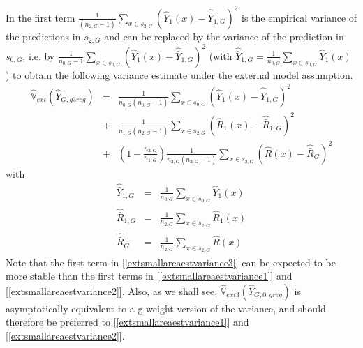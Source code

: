 \documentclass[a4paper,12pt,leqno, titlepage]{article}
\newcommand{\VAR}{\mathbb{V}}
\begin{document}
In the first term $\frac{1}{(n_{2,G}-1)}\sum_{x\in{s_{2,G}}}(\hat{Y}_1(x)-\hat{\bar{Y}}_{1,G})^2 $ is the empirical variance of the predictions in $s_{2,G}$ and can be replaced by the variance of the prediction in $s_{0,G}$, i.e. by $\frac{1}{n_{0,G}-1}\sum_{x\in{s_{0,G}}}(\hat{Y}_1(x)-\hat{\bar{Y}}_{1,G})^2$ (with
$\hat{\bar{Y}}_{1,G}=\frac{1}{n_{0,G}}\sum_{x\in{s_{0,G}}} \hat{Y}_1(x)$ ) to obtain the following variance estimate under the external model assumption.
 \begin{eqnarray}\label{extsmallareaestvariance3}
 \hat{\VAR}_{ext}(\hat{Y}_{G,g3reg})&=& \frac{1}{n_{0,G}(n_{0,G}-1)}\sum_{x\in{s_{0,G}}}(\hat{Y}_1(x)-\hat{\bar{Y}}_{1,G})^2 \nonumber \\
 &+& {\frac{1}{n_{1,G}(n_{2,G}-1)}\sum_{x\in{s}_{2,G}}}
 (\hat{R}_1(x)-\hat{\bar{R}}_{1,G})^2 \nonumber \\
 &+& (1-\frac{n_{2,G}}{n_{1,G}})\frac{1}{n_{2,G}(n_{2,G}-1)}\sum_{x\in{s_{2,G}}}(\hat{R}(x)-\hat{\bar{R}}_G)^2
 \end{eqnarray}
 \noindent with
 \begin{eqnarray*}
 \hat{\bar{Y}}_{1,G}&=&\frac{1}{n_{0,G}}\sum_{x\in{s_{0,G}}}\hat{Y}_1(x) \\
 \hat{\bar{R}}_{1,G}&=&\frac{1}{n_{2,G}}\sum_{x\in{s_{2,G}}}\hat{R}_1(x) \\
 \hat{\bar{R}}_{G}&=&\frac{1}{n_{2,G}}\sum_{x\in{s_{2,G}}}\hat{R}(x)
 \end{eqnarray*}
 \noindent Note that the first term in [\ref{extsmallareaestvariance3}] can be expected to be more stable than the first terms in [\ref{extsmallareaestvariance1}] and [\ref{extsmallareaestvariance2}]. Also, as we shall see,  $\hat{\VAR}_{ext3}(\hat{Y}_{G,0,greg})$ is asymptotically equivalent to a g-weight version of the variance, and should therefore be preferred to [\ref{extsmallareaestvariance1}] and [\ref{extsmallareaestvariance2}].
\end{document}
